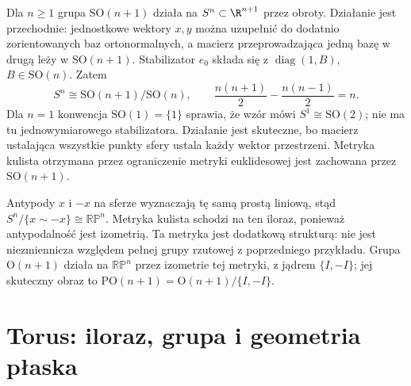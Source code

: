 \begin{przyklad}
\label{prz:klein-sfera}
Dla $n\geq1$ grupa $\mathrm{SO}(n+1)$ działa na
$S^n\subset\R^{n+1}$ przez obroty. Działanie jest
przechodnie: jednostkowe wektory $x,y$ można uzupełnić
do dodatnio zorientowanych baz ortonormalnych, a macierz
przeprowadzająca jedną bazę w drugą leży w
$\mathrm{SO}(n+1)$. Stabilizator $e_0$ składa się z
$\operatorname{diag}(1,B)$, $B\in\mathrm{SO}(n)$.
Zatem
\[
 S^n\cong\mathrm{SO}(n+1)/\mathrm{SO}(n),
 \qquad
 \frac{n(n+1)}2-\frac{n(n-1)}2=n.
\]
Dla $n=1$ konwencja $\mathrm{SO}(1)=\{1\}$ sprawia,
że wzór mówi $S^1\cong\mathrm{SO}(2)$; nie ma tu
jednowymiarowego stabilizatora. Działanie jest skuteczne,
bo macierz ustalająca wszystkie punkty sfery ustala
każdy wektor przestrzeni. Metryka kulista otrzymana
przez ograniczenie metryki euklidesowej jest zachowana
przez $\mathrm{SO}(n+1)$.

Antypody $x$ i $-x$ na sferze wyznaczają tę samą
prostą liniową, stąd $S^n/\{x\sim-x\}\cong\mathbb{RP}^n$.
Metryka kulista schodzi na ten iloraz, ponieważ
antypodalność jest izometrią. Ta metryka jest dodatkową
strukturą: nie jest niezmiennicza względem pełnej grupy
rzutowej z poprzedniego przykładu. Grupa
$\mathrm O(n+1)$ działa na $\mathbb{RP}^n$ przez izometrie
tej metryki, z jądrem $\{I,-I\}$; jej skuteczny obraz
to $\mathrm{PO}(n+1)=\mathrm O(n+1)/\{I,-I\}$.
\end{przyklad}

\section{Torus: iloraz, grupa i geometria płaska}
\label{sec:klein-torus}

